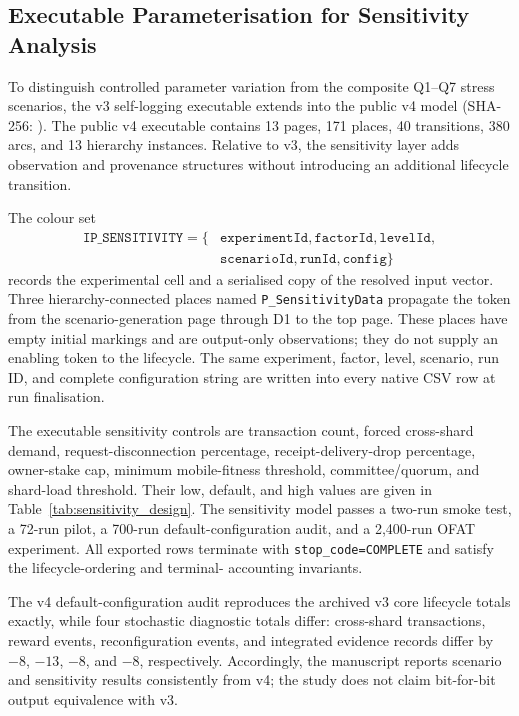 \documentclass[a4paper,fleqn]{cas-sc}
\begin{document}
\subsection{Executable Parameterisation for Sensitivity Analysis}
\label{subsec:parameterisation}

To distinguish controlled parameter variation from the composite Q1--Q7 stress
scenarios, the v3 self-logging executable extends into the public v4 model
\texttt{}
(SHA-256:
\texttt{}).
The public v4 executable contains 13 pages, 171 places, 40
transitions, 380 arcs, and 13 hierarchy instances. Relative to v3, the sensitivity layer adds observation and provenance structures
without introducing an additional lifecycle transition.

The colour set
\begin{equation}
\begin{split}
\texttt{IP\_SENSITIVITY}=\{&
\texttt{experimentId},\texttt{factorId},\texttt{levelId},\\
&\texttt{scenarioId},\texttt{runId},\texttt{config}\}
\end{split}
\end{equation}
records the experimental cell and a serialised copy of the resolved input
vector. Three hierarchy-connected places named
\texttt{P\_SensitivityData} propagate the token from the scenario-generation
page through D1 to the top page. These places have empty initial markings and
are output-only observations; they do not supply an enabling token to the
lifecycle. The same experiment, factor, level, scenario, run ID, and complete
configuration string are written into every native CSV row at run
finalisation.

The executable sensitivity controls are transaction count, forced cross-shard
demand, request-disconnection percentage, receipt-delivery-drop percentage,
owner-stake cap, minimum mobile-fitness threshold, committee/quorum, and
shard-load threshold. Their low, default, and high values are given in
Table~\ref{tab:sensitivity_design}. The sensitivity model passes a
two-run smoke test, a 72-run pilot, a 700-run default-configuration audit, and a
2,400-run OFAT experiment. All exported rows terminate with
\texttt{stop\_code=COMPLETE} and satisfy the lifecycle-ordering and terminal-
accounting invariants.

The v4 default-configuration audit reproduces the archived v3 core lifecycle totals exactly,
while four stochastic diagnostic totals differ: cross-shard transactions, reward
events, reconfiguration events, and integrated evidence records differ by
$-8$, $-13$, $-8$, and $-8$, respectively. Accordingly, the manuscript reports scenario and sensitivity results consistently from v4; the study does not claim bit-for-bit output equivalence with v3.
\end{document}

